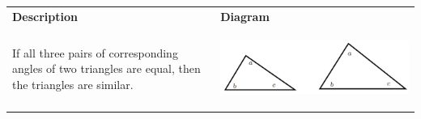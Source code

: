         \begin{center}
      
      \label{m39368*id318196}
      
    \noindent
      \tablelasttail{}
      \begin{xtabular*}{\mytablewidth}[t]{|p{10\mystarwidth}|p{10\mystarwidth}|}\hline
    
    
        
                    \textbf{Description}
                   &
    
    
        
                    \textbf{Diagram}
     \tabularnewline{}
    
    
        If all three pairs of corresponding angles of two triangles are equal, then the triangles are similar. &
    
    
        
                    
    \setcounter{subfigure}{0}

\label{m39368*id318251}
    \begin{center}
    \label{m39368*id318251!!!underscore!!!media}\label{m39368*id318251!!!underscore!!!printimage}\includegraphics[width=.25\columnwidth]{col11306.imgs/m39368_MG10C13_035.png} %
        

\end{center}
\end{xtabular*}
\end{center}

